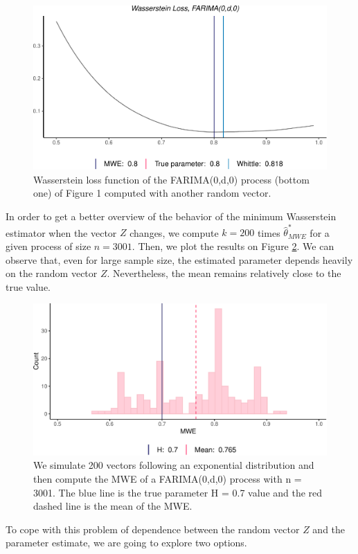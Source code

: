 \documentclass[
  11pt,
]{article}
\begin{document}
\begin{figure}[h]

{\centering \includegraphics[width=0.55\linewidth]{Master_thesis_V3_files/figure-latex/wasserstein_z-1} 

}

\caption{Wasserstein loss function of the FARIMA(0,d,0) process (bottom one) of Figure 1 computed with another random vector.}\label{fig:wasserstein_z}
\end{figure}

In order to get a better overview of the behavior of the minimum
Wasserstein estimator when the vector \(Z\) changes, we compute
\(k = 200\) times \(\hat \theta^*_{MWE}\) for a given process of size
\(n = 3001\). Then, we plot the results on Figure \ref{fig:MWE_n}. We
can observe that, even for large sample size, the estimated parameter
depends heavily on the random vector \(Z\). Nevertheless, the mean
remains relatively close to the true value.

\begin{figure}[h]

{\centering \includegraphics[width=0.6\linewidth]{Master_thesis_V3_files/figure-latex/MWE_n-1} 

}

\caption{We simulate 200 vectors following an exponential distribution and then compute the MWE of a FARIMA(0,d,0) process with n = 3001. The blue line is the true parameter H = 0.7 value and the red dashed line is the mean of the MWE.}\label{fig:MWE_n}
\end{figure}

To cope with this problem of dependence between the random vector \(Z\)
and the parameter estimate, we are going to explore two options.
\end{document}
